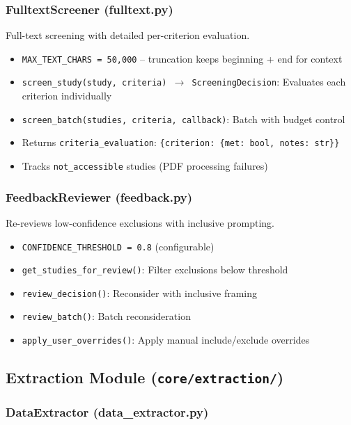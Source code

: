 \documentclass[11pt,a4paper]{article}
\begin{document}
\subsubsection{FulltextScreener (fulltext.py)}

Full-text screening with detailed per-criterion evaluation.

\begin{itemize}[nosep]
  \item \texttt{MAX\_TEXT\_CHARS = 50,000} -- truncation keeps beginning + end for context
  \item \texttt{screen\_study(study, criteria) $\to$ ScreeningDecision}: Evaluates each criterion individually
  \item \texttt{screen\_batch(studies, criteria, callback)}: Batch with budget control
  \item Returns \texttt{criteria\_evaluation}: \texttt{\{criterion: \{met: bool, notes: str\}\}}
  \item Tracks \texttt{not\_accessible} studies (PDF processing failures)
\end{itemize}

\subsubsection{FeedbackReviewer (feedback.py)}

Re-reviews low-confidence exclusions with inclusive prompting.

\begin{itemize}[nosep]
  \item \texttt{CONFIDENCE\_THRESHOLD = 0.8} (configurable)
  \item \texttt{get\_studies\_for\_review()}: Filter exclusions below threshold
  \item \texttt{review\_decision()}: Reconsider with inclusive framing
  \item \texttt{review\_batch()}: Batch reconsideration
  \item \texttt{apply\_user\_overrides()}: Apply manual include/exclude overrides
\end{itemize}

\subsection{Extraction Module (\texttt{core/extraction/})}

\subsubsection{DataExtractor (data\_extractor.py)}
\end{document}
